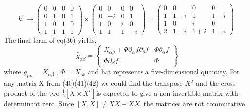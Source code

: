 \documentclass{article}
\begin{document}
\begin{equation}
 k^* \rightarrow 
 \left(\begin{matrix}
0 & 0 & 0 & 0 \\
0 & 1 & 0 & 1 \\
1 & 0 & 1 & 0 \\
1 & 1 & 1 & 1
\end{matrix}\right) \times
\left(\begin{matrix}
0 & 0 & 0 & 0 \\
0 & -i & 0 & 1 \\
1 & 0 & i & 0 \\
1 & 1 & 1 & -i
\end{matrix}\right) =
\left(\begin{matrix}
0 & 0 & 0 & 0 \\
1 & 1-i & 1 & 1-i \\
1 & 0 & i & 0 \\
2 & 1-i & 1+i & 1-i
\end{matrix}\right)
\end{equation} \newline The final form of eq(36) yields,
\begin{equation}\
\hat g_{\alpha \beta} =
 \begin{Bmatrix}
X_{\alpha \beta} + \Phi \partial_\alpha f \partial_\beta f & \Phi \partial_\alpha f\\
\Phi \partial_\beta f & \Phi
\end{Bmatrix}   
\end{equation} where $g_{\mu \nu}$ = $X_{\alpha \beta}$ , $\Phi$ = $X_{55}$ and hat represents a five-dimensional quantity. For any matrix X from (40)(41)(42) we could find the transpose $X^T$ and the cross product of the two
\begin{math}
\frac{1}{2}[ X \times X^T] 
\end{math}is expected to give a non-invertible matrix with determinant zero. Since $[X,X] \neq XX-XX$, the matrices are not commutative.
\end{document}
